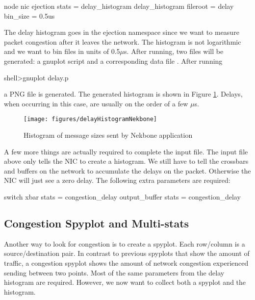 \begin{ViFile}
node {
 nic {
  ejection {
   stats = delay_histogram
   delay_histogram {
    fileroot = delay
    bin_size = 0.5us
   }
  }
 }
}
\end{ViFile}
The delay histogram goes in the ejection namespace since we want to measure packet congestion after it leaves the network.
The histogram is not logarithmic and we want to bin files in units of 0.5$\mu$s.
After running, two files will be generated: a gnuplot script and a corresponding data file .
After running

\begin{ShellCmd}
shell>gnuplot delay.p 
\end{ShellCmd}
a PNG file  is generated.
The generated histogram is shown in Figure \ref{fig:nekboneDelayHistogram}. 
Delays, when occurring in this case, are usually on the order of a few $\mu$s.

\begin{figure}
\centering
\texttt{[image: figures/delayHistogramNekbone]}
\caption{Histogram of message sizes sent by Nekbone application}
\label{fig:nekboneDelayHistogram}
\end{figure}

A few more things are actually required to complete the input file.
The input file above only tells the NIC to create a histogram.
We still have to tell the crossbars and buffers on the network to accumulate the delays on the packet.
Otherwise the NIC will just see a zero delay.
The following extra parameters are required:

\begin{ViFile}
switch {
 xbar {
   stats = congestion_delay
 }
 output_buffer {
  stats = congestion_delay
 }
}
\end{ViFile}

\subsection{Congestion Spyplot and Multi-stats}
\label{subsec:congestionSpyplot}

Another way to look for congestion is to create a spyplot.
Each row/column is a source/destination pair.
In contrast to previous spyplots that show the amount of traffic,
a congestion spyplot shows the amount of network congestion experienced sending between two points.
Most of the same parameters from the delay histogram are required.
However, we now want to collect both a spyplot and the histogram.

